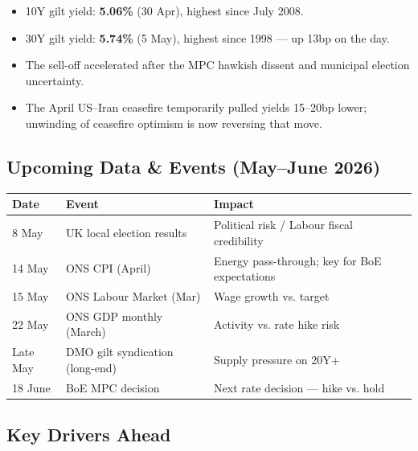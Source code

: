 \documentclass[11pt,a4paper]{article}
\begin{document}
\begin{itemize}[nosep, leftmargin=1.2em]
    \item 10Y gilt yield: \textbf{5.06\%} (30 Apr), highest since July 2008.
    \item 30Y gilt yield: \textbf{5.74\%} (5 May), highest since 1998 --- up 13bp on the day.
    \item The sell-off accelerated after the MPC hawkish dissent and municipal election uncertainty.
    \item The April US--Iran ceasefire temporarily pulled yields 15--20bp lower; unwinding of ceasefire optimism is now reversing that move.
\end{itemize}

\subsection*{Upcoming Data \& Events (May--June 2026)}

\begin{table}[H]
\centering\small
\begin{tabularx}{\textwidth}{lXl}
\toprule
\textbf{Date} & \textbf{Event} & \textbf{Impact} \\
\midrule
8 May & UK local election results & Political risk / Labour fiscal credibility \\
14 May & ONS CPI (April) & Energy pass-through; key for BoE expectations \\
15 May & ONS Labour Market (Mar) & Wage growth vs. target \\
22 May & ONS GDP monthly (March) & Activity vs. rate hike risk \\
Late May & DMO gilt syndication (long-end) & Supply pressure on 20Y+ \\
18 June & BoE MPC decision & Next rate decision --- hike vs. hold \\
\bottomrule
\end{tabularx}
\end{table}

\subsection*{Key Drivers Ahead}
\end{document}
